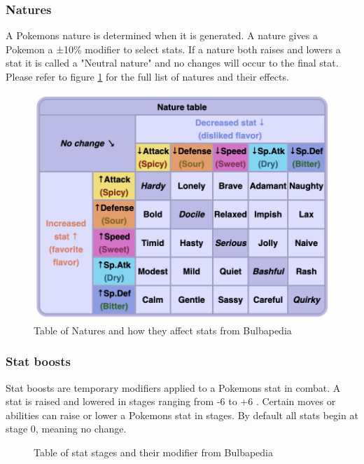\subsubsection{Natures}
A Pokemons nature \cite{Natures} is determined when it is generated. A nature gives a Pokemon a ±10\% modifier to select stats.
If a nature both raises and lowers a stat it is called a "Neutral nature" and no changes will occur to the final stat.
Please refer to figure \ref{tab:nature-table} for the full list of natures and their effects.
\begin{figure}[h]
  \centering
  \includegraphics[width=.8\textwidth]{assets/nature-stat-table.jpg}
  \caption{Table of Natures and how they affect stats from Bulbapedia \cite{Natures}}
  \label{tab:nature-table}
\end{figure}

\subsubsection{Stat boosts}
Stat boosts are temporary modifiers applied to a Pokemons stat in combat. A stat is raised and lowered in stages ranging from -6 to +6 \cite{StatBoosts}.
Certain moves or abilities can raise or lower a Pokemons stat in stages. By default all stats begin at stage 0, meaning no change.

\begin{figure}[h]
  \centering
  \caption{Table of stat stages and their modifier from Bulbapedia \cite{StatBoosts}}
  \label{tab:stat-stage-modifiers}

\end{figure}

